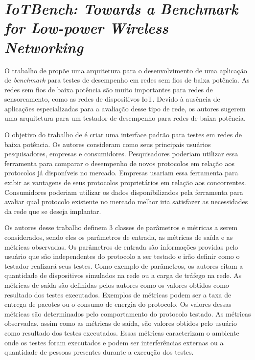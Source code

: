 \section{\textit{IoTBench: Towards a Benchmark for Low-power Wireless Networking}}

O trabalho de \cite{Boano2018} propõe uma arquitetura para o desenvolvimento de uma aplicação de \textit{benchmark} para testes de desempenho em redes sem fios de baixa potência.
As redes sem fios de baixa potência são muito importantes para redes de sensoreamento, como as redes de dispositivos IoT.
Devido à ausência de aplicações especializadas para a avaliação desse tipo de rede, os autores sugerem uma arquitetura para um testador de desempenho para redes de baixa potência.

O objetivo do trabalho de \cite{Boano2018} é criar uma interface padrão para testes em redes de baixa potência. Os autores consideram como seus principais usuários pesquisadores, empresas e consumidores.
Pesquisadores poderiam utilizar essa ferramenta para comparar o desempenho de novos protocolos em relação aos protocolos já disponíveis no mercado.
Empresas usariam essa ferramenta para exibir as vantagens de seus protocolos proprietários em relação aos concorrentes.
Consumidores poderiam utilizar os dados disponibilizados pela ferramenta para avaliar qual protocolo existente no mercado melhor iria satisfazer as necessidades da rede que se deseja implantar.

Os autores desse trabalho definem 3 classes de parâmetros e métricas a serem considerados, sendo eles os parâmetros de entrada, as métricas de saída e as métricas observadas.
Os parâmetros de entrada são informações providas pelo usuário que são independentes do protocolo a ser testado e irão definir como o testador realizará seus testes. Como exemplo de parâmetros, os autores citam a quantidade de dispositivos simulados na rede ou a carga de tráfego na rede.
As métricas de saída são definidas pelos autores como os valores obtidos como resultado dos testes executados. Exemplos de métricas podem ser a taxa de entrega de pacotes ou o consumo de energia do protocolo. Os valores dessas métricas são determinados pelo comportamento do protocolo testado.
As métricas observadas, assim como as métricas de saída, são valores obtidos pelo usuário como resultado dos testes executados. Essas métricas caracterizam o ambiente onde os testes foram executados e podem ser interferências externas ou a quantidade de pessoas presentes durante a execução dos testes.

